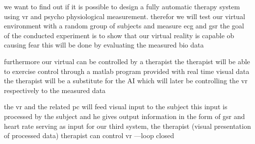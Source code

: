 

we want to find out if it is possible to design a fully automatic therapy system using vr and psycho physiological measurement.
therefor we will test our virtual environment with a random group of subjects
and measure ecg and gsr
the goal of the conducted experiment is to show that our virtual reality is capable ob causing fear
this will be done by evaluating the measured bio data 

furthermore our virtual can be controlled by a therapist 
the therapist will be able to exercise control through a matlab program 
provided with real time visual data the therapist will be a substitute for the AI which will later be controlling 
the vr respectively to the measured data

the vr and the related pc will feed visual input to the subject 
this input is processed by the subject and he gives output information in the form of gsr and heart rate
serving as input for our third system, the therapist (visual presentation of processed data)
therapist can control vr ---loop closed






